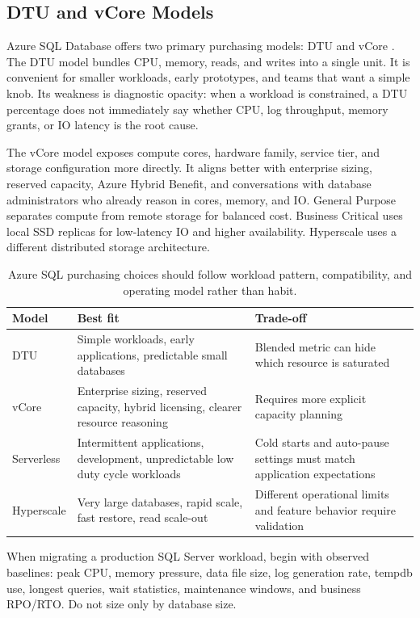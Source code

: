 \subsection{DTU and vCore Models}
Azure SQL Database offers two primary purchasing models: DTU and vCore \cite{microsoft2025sqldbPurchasing}. The DTU model bundles CPU, memory, reads, and writes into a single unit. It is convenient for smaller workloads, early prototypes, and teams that want a simple knob. Its weakness is diagnostic opacity: when a workload is constrained, a DTU percentage does not immediately say whether CPU, log throughput, memory grants, or IO latency is the root cause.

The vCore model exposes compute cores, hardware family, service tier, and storage configuration more directly. It aligns better with enterprise sizing, reserved capacity, Azure Hybrid Benefit, and conversations with database administrators who already reason in cores, memory, and IO. General Purpose separates compute from remote storage for balanced cost. Business Critical uses local SSD replicas for low-latency IO and higher availability. Hyperscale uses a different distributed storage architecture.

\begin{table}[H]
\centering
\small
\begin{tabular}{@{}p{3.0cm}p{4.5cm}p{5.0cm}@{}}
\toprule
\textbf{Model} & \textbf{Best fit} & \textbf{Trade-off} \\
\midrule
DTU & Simple workloads, early applications, predictable small databases & Blended metric can hide which resource is saturated \\
vCore & Enterprise sizing, reserved capacity, hybrid licensing, clearer resource reasoning & Requires more explicit capacity planning \\
Serverless & Intermittent applications, development, unpredictable low duty cycle workloads & Cold starts and auto-pause settings must match application expectations \\
Hyperscale & Very large databases, rapid scale, fast restore, read scale-out & Different operational limits and feature behavior require validation \\
\bottomrule
\end{tabular}
\caption{Azure SQL purchasing choices should follow workload pattern, compatibility, and operating model rather than habit.}
\label{tab:azure-sql-purchasing}
\end{table}

\begin{tipbox}
When migrating a production SQL Server workload, begin with observed baselines: peak CPU, memory pressure, data file size, log generation rate, tempdb use, longest queries, wait statistics, maintenance windows, and business RPO/RTO. Do not size only by database size.
\end{tipbox}

